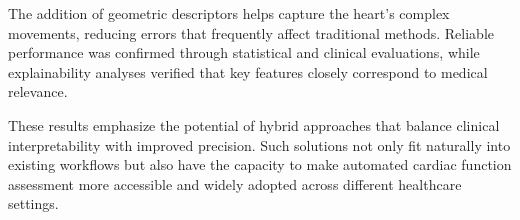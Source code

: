 \documentclass[runningheads]{llncs}
\begin{document}
The addition of geometric descriptors helps capture the heart’s complex movements, reducing errors that frequently affect traditional methods. Reliable performance was confirmed through statistical and clinical evaluations, while explainability analyses verified that key features closely correspond  to medical relevance.

These results emphasize the potential of hybrid approaches that balance clinical interpretability with improved precision. Such solutions not only fit naturally into existing workflows but also have the capacity to make automated cardiac function assessment more accessible and widely adopted across different healthcare settings.



%
%
%
% 
% 
%
\end{document}
